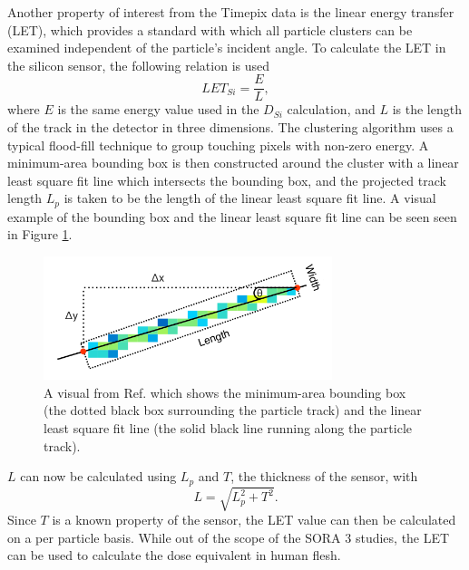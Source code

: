 Another property of interest from the Timepix data is the linear energy transfer (LET), which provides a standard with which all particle clusters can be examined independent of the particle's incident angle.
To calculate the LET in the silicon sensor, the following relation is used
\begin{equation*}
  LET_{Si} = \dfrac{E}{L},
\end{equation*}
where $E$ is the same energy value used in the $D_{Si}$ calculation, and $L$ is the length of the track in the detector in three dimensions.
The clustering algorithm uses a typical flood-fill technique to group touching pixels with non-zero energy.
A minimum-area bounding box is then constructed around the cluster with a linear least square fit line which intersects the bounding box, and the projected track length $L_p$ is taken to be the length of the linear least square fit line.
A visual example of the bounding box and the linear least square fit line can be seen seen in Figure \ref{fig:stuart-track-example}.
\begin{figure}[h!]
	\begin{center}
		\includegraphics[width=0.75\textwidth]{figures/stuart-track-example.png}
		\caption{A visual from Ref. \cite{Stuart-Thesis} which shows the minimum-area bounding box (the dotted black box surrounding the particle track) and the linear least square fit line (the solid black line running along the particle track).}
		\label{fig:stuart-track-example}
	\end{center}
\end{figure}
$L$ can now be calculated using $L_p$ and $T$, the thickness of the sensor, with
\begin{equation*}
  L = \sqrt{L_p^2 + T^2}.
\end{equation*}
Since $T$ is a known property of the sensor, the LET value can then be calculated on a per particle basis.
While out of the scope of the SORA 3 studies, the LET can be used to calculate the dose equivalent in human flesh.


